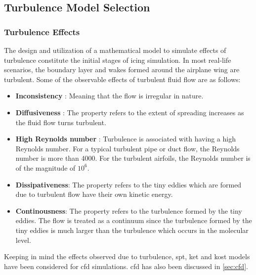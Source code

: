 \documentclass[english]{kththesis}
\begin{document}
\subsection{Turbulence Model Selection}
\subsubsection{Turbulence Effects}
\label{subsec:modelsel}
The design and utilization of a mathematical model to simulate effects of turbulence constitute the initial stages of icing simulation. In most real-life scenarios, the boundary layer and wakes formed around the airplane wing are turbulent. 
Some of the observable effects of turbulent fluid flow are as follows: \cite{Davidson2018}
\begin{itemize}
  \item \textbf{Inconsistency} : Meaning that the flow is irregular in nature.
  \item \textbf{Diffusiveness} : The property refers to the extent of spreading increases as the fluid flow turns turbulent.
  \item \textbf{High Reynolds number} : Turbulence is associated with having a high Reynolds number. For a typical turbulent pipe or duct flow, the Reynolds number is more than 4000.  For the turbulent airfoils, the Reynolds number is of the magnitude of $10^6$. 
  \item \textbf{Dissipativeness}: The property refers to the tiny eddies which are formed due to turbulent flow have their own kinetic energy.
   \item \textbf{Continousness}: The property refers to the turbulence formed by the tiny eddies. The flow is treated as a continuum since the turbulence formed by the tiny eddies is much larger than the turbulence which occurs in the molecular level.
 \end{itemize}
Keeping in mind the effects observed due to turbulence, \acrshort{spt}, \acrshort{ket} and \acrshort{kost} models have been considered for \acrshort{cfd} simulations. \acrshort{cfd} has also been discussed in \ref{sec:cfd}.
\end{document}
